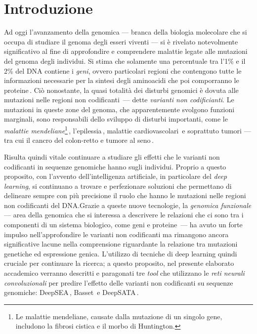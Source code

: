\chapter{Introduzione}\label{chp:introduction}

Ad oggi l'avanzamento della genomica — branca della biologia molecolare che si occupa di studiare il genoma degli esseri viventi — si è rivelato notevolmente significativo al fine di approfondire e comprendere malattie legate alle mutazioni del genoma degli individui. Si stima che solamente una percentuale tra l'1\% e il 2\% del DNA contiene i \textsl{geni}, ovvero particolari regioni che contengono tutte le informazioni necessarie per la sintesi degli aminoacidi che poi comporranno le proteine\,\cite{sahu2011identification, pollard2022cell}. Ciò nonostante, la quasi totalità dei disturbi genomici è dovuta alle mutazioni nelle regioni non codificanti\,\cite{zhang2015non} — dette \textsl{varianti non codificianti}. Le mutazioni in queste zone del genoma, che apparentemente svolgono funzioni marginali, sono responsabili dello sviluppo di disturbi importanti, come le \textsl{malattie mendeliane}\footnote{Le malattie mendeliane, causate dalla mutazione di un singolo gene, includono la fibrosi cistica e il morbo di Huntington.}\,\cite{french2020role, chial2008mendelian}, l'epilessia\,\cite{pagni2022non}, malattie cardiovascolari\,\cite{kapoor2014enhancer, zhang2015non} e soprattuto tumori — tra cui il cancro del colon-retto e tumore al seno\,\cite{khurana2016role, tian2019systematic, bojesen2013multiple, michailidou2017association}.

Risulta quindi vitale continuare a studiare gli effetti che le varianti non codificanti in sequenze genomiche hanno sugli individui. Proprio a questo proposito, con l'avvento dell'intelligenza artificiale, in particolare del \textsl{deep learning}, si continuano a trovare e perfezionare soluzioni che permettano di delineare sempre con più precisione il ruolo che hanno le mutazioni nelle regioni non codificanti del DNA.\@ Grazie a queste nuove tecnologie, la \textsl{genomica funzionale} — area della genomica che si interessa a descrivere le relazioni che ci sono tra i componenti di un sistema biologico, come geni e proteine\,\cite{caudai2021ai} — ha avuto un forte impulso nell'approfondire le varianti non codificanti ma rimangono ancora significative lacune nella comprensione riguardante la relazione tra mutazioni genetiche ed espressione genica. L'utilizzo di tecniche di deep learning quindi cruciale per continuare la ricerca; a questo proposito, nel presente elaborato accademico verranno descritti e paragonati tre \textsl{tool} che utilizzano le \textsl{reti neurali convoluzionali} per predire l'effetto delle varianti non codificanti su sequenze genomiche: DeepSEA\,\cite{zhou2015predicting}, Basset\,\cite{kelley2016basset} e DeepSATA\,\cite{ma2023deepsata}.



